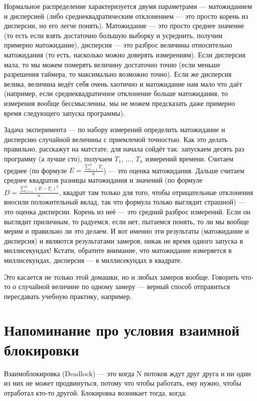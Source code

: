 \documentclass{../../text-style}
\begin{document}
Нормальное распределение характеризуется двумя параметрами --- матожиданием и дисперсией (либо среднеквадратическим отклонением --- это просто корень из дисперсии, но его легче понять). Матожидание --- это просто среднее значение (то есть если взять достаточно большую выборку и усреднить, получим примерно матожидание), дисперсия --- это разброс величины относительно матожидания (то есть, насколько можно доверять измерениям). Если дисперсия мала, то мы можем померять величину достаточно точно (если меньше разрешения таймера, то максимально возможно точно). Если же дисперсия велика, величина ведёт себя очень хаотично и матожидание нам мало что даёт (например, если среднеквадратичное отклонение больше матожидания, то измерения вообще бессмысленны, мы не можем предсказать даже примерно время следующего запуска программы). 

Задача эксперимента --- по набору измерений определить матожидание и дисперсию случайной величины с приемлемой точностью. Как это делать правильно, расскажут на матстате, для начала сойдёт так: запускаем десять раз программу (а лучше сто), получаем $T_1$, ..., $T_n$ измерений времени. Считаем среднее (по формуле $E = \frac{\sum_{i = 1}^{n}T_i}{n}$) --- это оценка матожидания. Дальше считаем среднее квадратов разницы матожидания и значений (по формуле $D = \frac{\sum_{i = 1}^{n}(E - T_i)^2}{n}$, квадрат там только для того, чтобы отрицательные отклонения вносили положительный вклад, так что формула только выглядит страшной) --- это оценка дисперсии. Корень из неё --- это средний разброс измерений. Если он выглядит приличным, то радуемся, если нет, пытаемся понять, то ли мы вообще мерим и правильно ли это делаем. И вот именно эти результаты (матожидание и дисперсия) и являются результатами замеров, никак не время одного запуска в миллисекундах! Кстати, обратите внимание, что матожидание измеряется в миллисекундах, дисперсия --- в миллисекундах в квадрате.

Это касается не только этой домашки, но и любых замеров вообще. Говорить что-то о случайной величине по одному замеру --- верный способ отправиться пересдавать учебную практику, например.

\section{Напоминание про условия взаимной блокировки}

Взаимоблокировка (Deadlock) --- это когда N потоков ждут друг друга и ни один из них не может продвинуться, потому что чтобы работать, ему нужно, чтобы отработал кто-то другой. Блокировка возникает тогда, когда:
\end{document}
